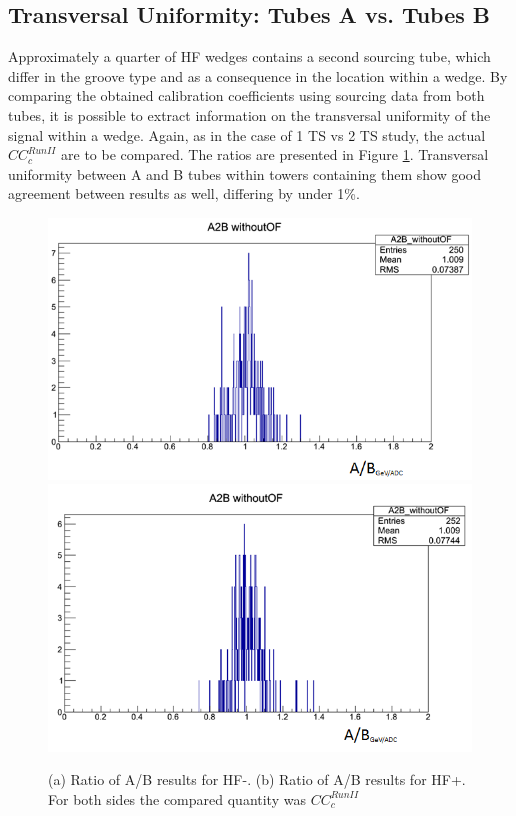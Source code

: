 \subsection{Transversal Uniformity: Tubes A vs. Tubes B}
Approximately a quarter of HF wedges contains a second sourcing tube, which
differ in the groove type and as a consequence in the location within a wedge.
By comparing the obtained calibration coefficients using sourcing data from both
tubes, it is possible to extract information on the transversal uniformity of the signal within a wedge. Again, as in the case of 1 TS vs 2 TS study, the actual ${CC}^{Run II}_{c}$ are to be compared. The ratios are presented in Figure \ref{fig:HF_A2B}. Transversal uniformity between A and B tubes within towers containing them show good agreement between results as well, differing by under 1\%.
\begin{figure}[htb]
    \centering
    \includegraphics[width=.45\textwidth]{figures/ch_hfcalibration/HFM_A2B_woOF.png}
    \includegraphics[width=.45\textwidth]{figures/ch_hfcalibration/HFP_A2B_woOF.png}
    \caption{(a) Ratio of A/B results for HF-. (b) Ratio of A/B results for HF+. For both sides the compared quantity was ${CC}^{Run II}_{c}$}
    \label{fig:HF_A2B}
\end{figure}


